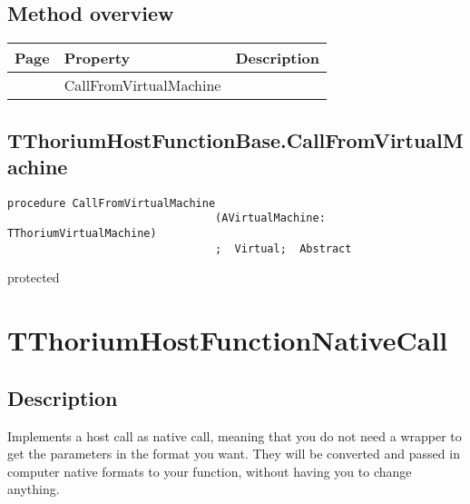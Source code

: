 \subsection{Method overview}
\label{thoriumcorepkg:thorium:tthoriumhostfunctionbase:methods}
\begin{tabularx}{\textwidth}{llX}
Page & Property & Description  \\ \hline
\pageref{thoriumcorepkg:thorium:tthoriumhostfunctionbase:callfromvirtualmachine} & CallFromVirtualMachine  &  \\
\hline
\end{tabularx}
\subsection{TThoriumHostFunctionBase.CallFromVirtualMachine}
\label{thoriumcorepkg:thorium:tthoriumhostfunctionbase:callfromvirtualmachine}
\begin{FPCList}
\Declaration 

\begin{verbatim}
procedure CallFromVirtualMachine
                                (AVirtualMachine: TThoriumVirtualMachine)
                                ;  Virtual;  Abstract
\end{verbatim}
\Visibility
protected
\end{FPCList}
\section{TThoriumHostFunctionNativeCall}
\label{thoriumcorepkg:thorium:tthoriumhostfunctionnativecall}
\subsection{Description}
Implements a host call as native call, meaning that you do not need a wrapper to get the parameters in the format you want. They will be converted and passed in computer native formats to your function, without having you to change anything.%
